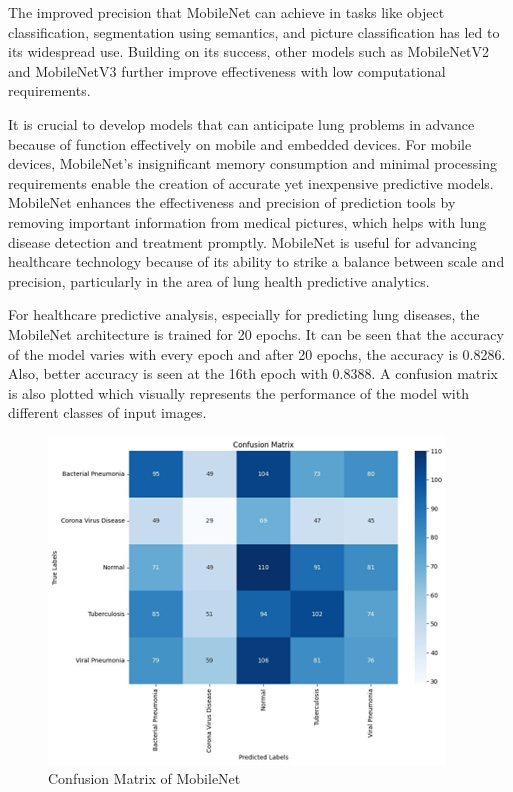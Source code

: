 The improved precision that MobileNet can achieve in tasks like object classification, segmentation using semantics, and picture classification has led to its widespread use. Building on its success, other models such as MobileNetV2 and MobileNetV3 further improve effectiveness with low computational requirements. 

It is crucial to develop models that can anticipate lung problems in advance because of function effectively on mobile and embedded devices. For mobile devices, MobileNet's insignificant memory consumption and minimal processing requirements enable the creation of accurate yet inexpensive predictive models. MobileNet enhances the effectiveness and precision of prediction tools by removing important information from medical pictures, which helps with lung disease detection and treatment promptly. MobileNet is useful for advancing healthcare technology because of its ability to strike a balance between scale and precision, particularly in the area of lung health predictive analytics.

For healthcare predictive analysis, especially for predicting lung diseases, the MobileNet architecture is trained for 20 epochs. It can be seen that the accuracy of the model varies with every epoch and after 20  epochs, the accuracy is 0.8286. Also, better accuracy is seen at the 16th epoch with 0.8388. A confusion matrix is also plotted which visually represents the performance of the model with different classes of input images.
\begin{figure}[ht]
    \centering
    \includegraphics[scale=0.8]{figures/Picture3.png}
    \caption{Confusion Matrix of MobileNet}
    \label{fig:chart_a}
\end{figure}
